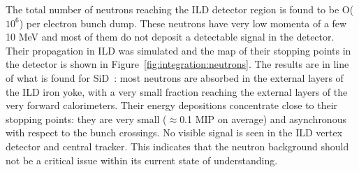 The total number of neutrons reaching the ILD detector region is found to be O($10^6$) per electron bunch dump. These neutrons have very low momenta of a few 10 MeV and most of them do not deposit a detectable signal in the detector. Their propagation in ILD was simulated and the map of their stopping points in the detector is shown in Figure~\ref{fig:integration:neutrons}. The results are in line of what is found for SiD~\cite{ild:bib:schuetz_thesis}: most neutrons are absorbed in the external layers of the ILD iron yoke, with a very small fraction reaching the external layers of the very forward calorimeters. Their energy depositions concentrate close to their stopping points: they are very small ($\approx$0.1 MIP on average) and asynchronous with respect to the bunch crossings. No visible signal is seen in the ILD vertex detector and central tracker. This indicates that the neutron background should not be a critical issue within its current state of understanding.

